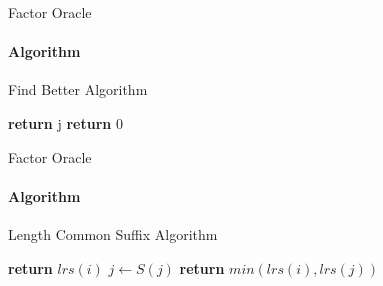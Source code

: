 \begin{frame}[fragile]{Factor Oracle}
  \framesubtitle{Algorithm}
  \begin{algorithm}[H]
    \caption{Find Better Algorithm}\label{alg:fb}
    \begin{algorithmic}[1]
      \State \textbf{return} j
      \EndIf
      \EndFor
      \State \textbf{return} 0
      \EndFunction
    \end{algorithmic}
  \end{algorithm}
\end{frame}

\begin{frame}[fragile]{Factor Oracle}
  \framesubtitle{Algorithm}
  \begin{algorithm}[H]
    \caption{Length Common Suffix Algorithm}\label{alg:lcs}
    \begin{algorithmic}[1]
      \State \textbf{return} $lrs(i)$
      \Else
      \State $j \gets S(j)$
      \EndWhile
      \EndIf
      \State \textbf{return} $min(lrs(i),lrs(j))$
      \EndFunction
    \end{algorithmic}
  \end{algorithm}
\end{frame}


